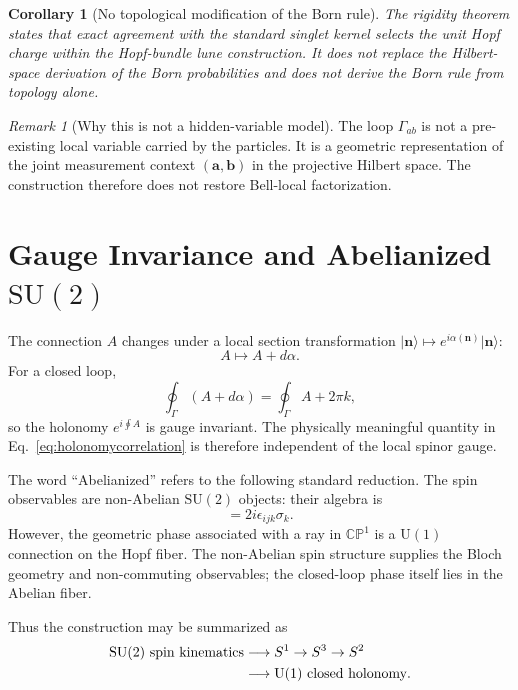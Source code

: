 \documentclass[
  aps,
  pra,
  reprint,
  superscriptaddress,
  nofootinbib,
  longbibliography,
  floatfix,
  amsmath,
  amssymb
]{revtex4-2}
\theoremstyle{plain}
\newtheorem{corollary}[theorem]{Corollary}
\theoremstyle{definition}
\theoremstyle{remark}
\newtheorem{remark}[theorem]{Remark}
\newcommand{\ket}[1]{\lvert #1\rangle}
\newcommand{\SU}{\mathrm{SU}}
\newcommand{\UU}{\mathrm{U}}
\newcommand{\CP}{\mathbb{CP}}
\begin{document}
\begin{corollary}[No topological modification of the Born rule]
\label{cor:nobornrulefromtopology}
The rigidity theorem states that exact agreement with the standard singlet kernel selects the unit Hopf charge within the Hopf-bundle lune construction.  It does not replace the Hilbert-space derivation of the Born probabilities and does not derive the Born rule from topology alone.
\end{corollary}

\begin{remark}[Why this is not a hidden-variable model]
The loop \(\Gamma_{ab}\) is not a pre-existing local variable carried by the particles.  It is a geometric representation of the joint measurement context \((\bm a,\bm b)\) in the projective Hilbert space.  The construction therefore does not restore Bell-local factorization.
\end{remark}

\section{Gauge Invariance and Abelianized \(\SU(2)\)}
\label{sec:gauge}

The connection \(A\) changes under a local section transformation \(\ket{\bm n}\mapsto e^{i\alpha(\bm n)}\ket{\bm n}\):
\begin{equation}
A\mapsto A+d\alpha.
\end{equation}
For a closed loop,
\begin{equation}
\oint_\Gamma(A+d\alpha)=\oint_\Gamma A+2\pi k,
\end{equation}
so the holonomy \(e^{i\oint A}\) is gauge invariant.  The physically meaningful quantity in Eq.~\eqref{eq:holonomycorrelation} is therefore independent of the local spinor gauge.

The word ``Abelianized'' refers to the following standard reduction.  The spin observables are non-Abelian \(\SU(2)\) objects: their algebra is
\begin{equation}
[\sigma_i,\sigma_j]=2i\epsilon_{ijk}\sigma_k.
\end{equation}
However, the geometric phase associated with a ray in \(\CP^1\) is a \(\UU(1)\) connection on the Hopf fiber.  The non-Abelian spin structure supplies the Bloch geometry and non-commuting observables; the closed-loop phase itself lies in the Abelian fiber.

Thus the construction may be summarized as
\begin{align}
\SU(2)\ \hbox{spin kinematics}
&\longrightarrow S^1\to S^3\to S^2 \nonumber\\
&\longrightarrow \UU(1)\ \hbox{closed holonomy}.
\end{align}
\end{document}
